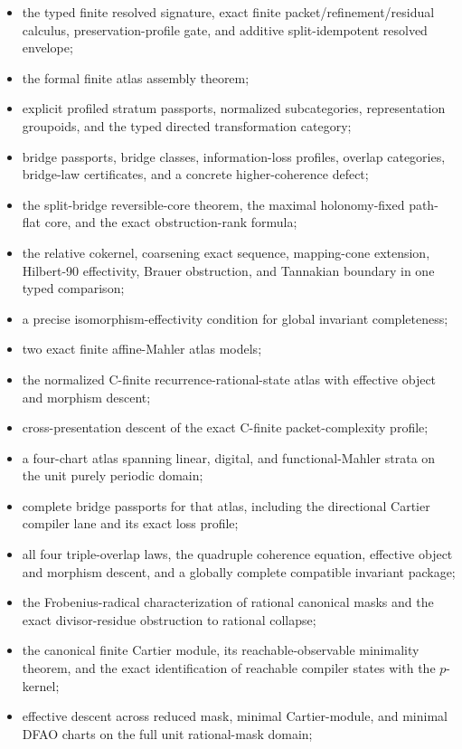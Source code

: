\begin{itemize}
\item the typed finite resolved signature, exact finite packet/refinement/residual calculus, preservation-profile gate, and additive split-idempotent resolved envelope;
\item the formal finite atlas assembly theorem;
\item explicit profiled stratum passports, normalized subcategories, representation groupoids, and the typed directed transformation category;
\item bridge passports, bridge classes, information-loss profiles, overlap categories, bridge-law certificates, and a concrete higher-coherence defect;
\item the split-bridge reversible-core theorem, the maximal holonomy-fixed path-flat core, and the exact obstruction-rank formula;
\item the relative cokernel, coarsening exact sequence, mapping-cone extension, Hilbert-90 effectivity, Brauer obstruction, and Tannakian boundary in one typed comparison;
\item a precise isomorphism-effectivity condition for global invariant completeness;
\item two exact finite affine-Mahler atlas models;
\item the normalized C-finite recurrence-rational-state atlas with effective object and morphism descent;
\item cross-presentation descent of the exact C-finite packet-complexity profile;
\item a four-chart atlas spanning linear, digital, and functional-Mahler strata on the unit purely periodic domain;
\item complete bridge passports for that atlas, including the directional Cartier compiler lane and its exact loss profile;
\item all four triple-overlap laws, the quadruple coherence equation, effective object and morphism descent, and a globally complete compatible invariant package;
\item the Frobenius-radical characterization of rational canonical masks and the exact divisor-residue obstruction to rational collapse;
\item the canonical finite Cartier module, its reachable-observable minimality theorem, and the exact identification of reachable compiler states with the \(p\)-kernel;
\item effective descent across reduced mask, minimal Cartier-module, and minimal DFAO charts on the full unit rational-mask domain;

\end{itemize}
